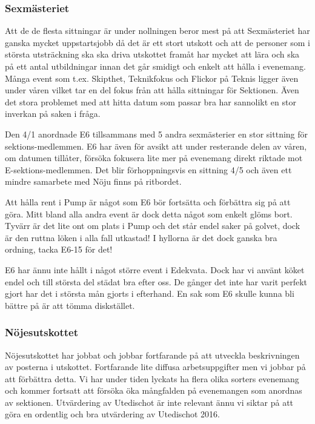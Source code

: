 \documentclass[../_main/handlingar.tex]{subfiles}
\begin{document}
\subsubsection*{Sexmästeriet}
Att de de flesta sittningar är under nollningen beror mest på att Sexmästeriet har ganska mycket uppstartsjobb då det är ett stort utskott och att de personer som i största utsträckning ska ska driva utskottet framåt har mycket att lära och ska på ett antal utbildningar innan det går smidigt och enkelt att hålla i evenemang. Många event som t.ex. Skipthet, Teknikfokus och Flickor på Teknis ligger även under våren vilket tar en del fokus från att hålla sittningar för Sektionen. Även det stora problemet med att hitta datum som passar bra har sannolikt en stor inverkan på saken i fråga.

Den 4/1 anordnade E6 tillsammans med 5 andra sexmästerier en stor sittning för sektions-medlemmen. E6 har även för avsikt att under resterande delen av våren, om datumen tillåter, försöka fokusera lite mer på evenemang direkt riktade mot E-sektions-medlemmen. Det blir förhoppningsvis en sittning 4/5 och även ett mindre samarbete med Nöju finns på ritbordet.

Att hålla rent i Pump är något som E6 bör fortsätta och förbättra sig på att göra. Mitt bland alla andra event är dock detta något som enkelt glöms bort. Tyvärr är det lite ont om plats i Pump och det står endel saker på golvet, dock är den ruttna löken i alla fall utkastad! I hyllorna är det dock ganska bra ordning, tacka E6-15 för det!

E6 har ännu inte hållt i något större event i Edekvata. Dock har vi använt köket endel och till största del städat bra efter oss. De gånger det inte har varit perfekt gjort har det i största mån gjorts i efterhand. En sak som E6 skulle kunna bli bättre på är att tömma diskstället.

\subsubsection*{Nöjesutskottet}
Nöjesutskottet har jobbat och jobbar fortfarande på att utveckla beskrivningen av posterna i utskottet. Fortfarande lite diffusa arbetsuppgifter men vi jobbar på att förbättra detta. Vi har under tiden lyckats ha flera olika sorters evenemang och kommer fortsatt att försöka öka mångfalden på evenemangen som anordnas av sektionen. Utvärdering av Utedischot är inte relevant ännu vi siktar på att göra en ordentlig och bra utvärdering av Utedischot 2016.
\end{document}

